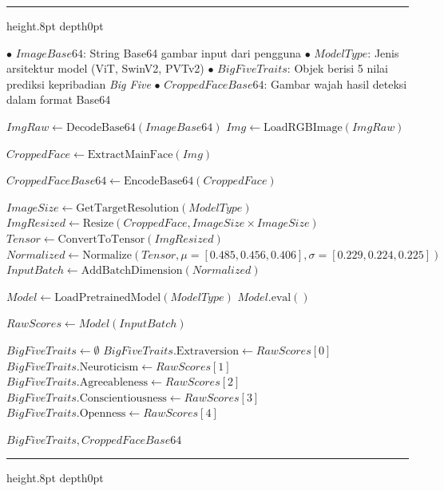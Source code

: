 {
	\vspace{2ex}
	\hrule height.8pt depth0pt \kern5pt
	
	\begin{algorithmic}[1]
		\Input 
		\Statex $\bullet$ $ImageBase64$: String Base64 gambar input dari pengguna
		\Statex $\bullet$ $ModelType$: Jenis arsitektur model (ViT, SwinV2, PVTv2)
		\Output 
		\Statex $\bullet$ $BigFiveTraits$: Objek berisi 5 nilai prediksi kepribadian \textit{Big Five} 
		\Statex $\bullet$ $CroppedFaceBase64$: Gambar wajah hasil deteksi dalam format Base64
		
		\State $ImgRaw \gets \text{DecodeBase64}(ImageBase64)$
		\State $Img \gets \text{LoadRGBImage}(ImgRaw)$
		
		\State $CroppedFace \gets \text{ExtractMainFace}(Img)$ 
		
		\State \Return {}
		\EndIf
		
		\State $CroppedFaceBase64 \gets \text{EncodeBase64}(CroppedFace)$
		
		\State $ImageSize \gets \text{GetTargetResolution}(ModelType)$
		\State $ImgResized \gets \text{Resize}(CroppedFace, ImageSize \times ImageSize)$
		\State $Tensor \gets \text{ConvertToTensor}(ImgResized)$
		\State $Normalized \gets \text{Normalize}(Tensor, \mu=[0.485, 0.456, 0.406], \sigma=[0.229, 0.224, 0.225])$ %
		\State $InputBatch \gets \text{AddBatchDimension}(Normalized)$
		
		\State $Model \gets \text{LoadPretrainedModel}(ModelType)$  
		\State $Model.\text{eval}()$ 
		
		\State $RawScores \gets Model(InputBatch)$ 
		
		\State $BigFiveTraits \gets \emptyset$ 
		\State $BigFiveTraits.\text{Extraversion} \gets RawScores[0]$
		\State $BigFiveTraits.\text{Neuroticism} \gets RawScores[1]$
		\State $BigFiveTraits.\text{Agreeableness} \gets RawScores[2]$
		\State $BigFiveTraits.\text{Conscientiousness} \gets RawScores[3]$
		\State $BigFiveTraits.\text{Openness} \gets RawScores[4]$
		
		\State \Return $BigFiveTraits, CroppedFaceBase64$
		\EndProcedure
	\end{algorithmic}
	
	\nopagebreak %
	\kern2pt\hrule height.8pt depth0pt \kern15pt 
	\nopagebreak
	
	\label{alg:inference-api}
}

